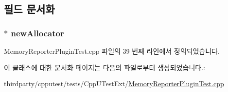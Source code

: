 \subsection{필드 문서화}
\subsubsection[{\texorpdfstring{new\+Allocator}{newAllocator}}]{$\ast$ new\+Allocator\hspace{0.3cm}{\ttfamily [private]}}\hypertarget{class_temporary_default_new_allocator_aa3ec3ae81071b9f1fe37b6363f877975}{}\label{class_temporary_default_new_allocator_aa3ec3ae81071b9f1fe37b6363f877975}


Memory\+Reporter\+Plugin\+Test.\+cpp 파일의 39 번째 라인에서 정의되었습니다.



이 클래스에 대한 문서화 페이지는 다음의 파일로부터 생성되었습니다.\+:\begin{DoxyCompactItemize}
\item 
thirdparty/cpputest/tests/\+Cpp\+U\+Test\+Ext/\hyperlink{_memory_reporter_plugin_test_8cpp}{Memory\+Reporter\+Plugin\+Test.\+cpp}\end{DoxyCompactItemize}
